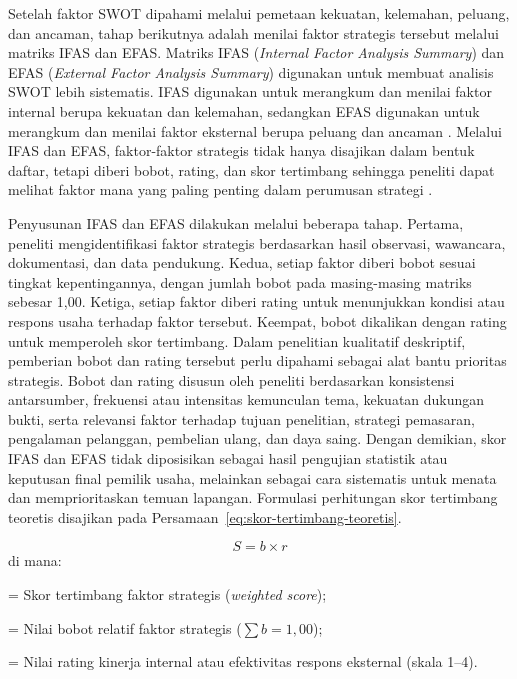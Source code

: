 Setelah faktor SWOT dipahami melalui pemetaan kekuatan, kelemahan, peluang, dan ancaman, tahap berikutnya adalah menilai faktor strategis tersebut melalui matriks IFAS dan EFAS. Matriks IFAS (\textit{Internal Factor Analysis Summary}) dan EFAS (\textit{External Factor Analysis Summary}) digunakan untuk membuat analisis SWOT lebih sistematis. IFAS digunakan untuk merangkum dan menilai faktor internal berupa kekuatan dan kelemahan, sedangkan EFAS digunakan untuk merangkum dan menilai faktor eksternal berupa peluang dan ancaman \parencite{rangkuti2016analisisSWOT,syafaat2020sepatu}. Melalui IFAS dan EFAS, faktor-faktor strategis tidak hanya disajikan dalam bentuk daftar, tetapi diberi bobot, rating, dan skor tertimbang sehingga peneliti dapat melihat faktor mana yang paling penting dalam perumusan strategi \parencite{david2023strategicmanagement,hendrizon2024madayacoffee}.

Penyusunan IFAS dan EFAS dilakukan melalui beberapa tahap. Pertama, peneliti mengidentifikasi faktor strategis berdasarkan hasil observasi, wawancara, dokumentasi, dan data pendukung. Kedua, setiap faktor diberi bobot sesuai tingkat kepentingannya, dengan jumlah bobot pada masing-masing matriks sebesar 1,00. Ketiga, setiap faktor diberi rating untuk menunjukkan kondisi atau respons usaha terhadap faktor tersebut. Keempat, bobot dikalikan dengan rating untuk memperoleh skor tertimbang. Dalam penelitian kualitatif deskriptif, pemberian bobot dan rating tersebut perlu dipahami sebagai alat bantu prioritas strategis. Bobot dan rating disusun oleh peneliti berdasarkan konsistensi antarsumber, frekuensi atau intensitas kemunculan tema, kekuatan dukungan bukti, serta relevansi faktor terhadap tujuan penelitian, strategi pemasaran, pengalaman pelanggan, pembelian ulang, dan daya saing. Dengan demikian, skor IFAS dan EFAS tidak diposisikan sebagai hasil pengujian statistik atau keputusan final pemilik usaha, melainkan sebagai cara sistematis untuk menata dan memprioritaskan temuan lapangan. Formulasi perhitungan skor tertimbang teoretis disajikan pada Persamaan~\ref{eq:skor-tertimbang-teoretis}.

\begin{equation}
    \label{eq:skor-tertimbang-teoretis}
    S = b \times r
\end{equation}
di mana:
\begin{description}[font=\normalfont\itshape, leftmargin=2em, style=sameline, nosep]
    \item[$S$] = Skor tertimbang faktor strategis (\textit{weighted score});
    \item[$b$] = Nilai bobot relatif faktor strategis ($\sum b = 1{,}00$);
    \item[$r$] = Nilai rating kinerja internal atau efektivitas respons eksternal (skala 1--4).
\end{description}

